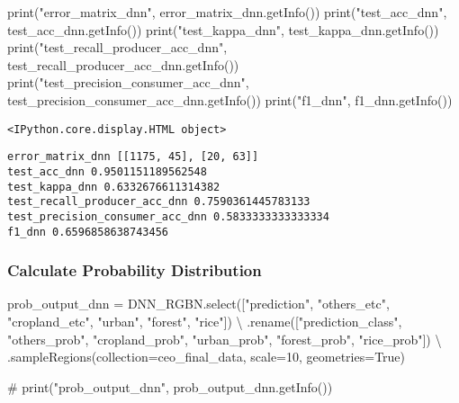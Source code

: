 \documentclass[
  letterpaper,
  DIV=11,
  numbers=noendperiod]{scrreprt}
\newenvironment{Shaded}{\begin{snugshade}}{\end{snugshade}}
\newcommand{\BuiltInTok}[1]{\textcolor[rgb]{0.00,0.23,0.31}{#1}}
\newcommand{\CommentTok}[1]{\textcolor[rgb]{0.37,0.37,0.37}{#1}}
\newcommand{\DecValTok}[1]{\textcolor[rgb]{0.68,0.00,0.00}{#1}}
\newcommand{\NormalTok}[1]{\textcolor[rgb]{0.00,0.23,0.31}{#1}}
\newcommand{\OperatorTok}[1]{\textcolor[rgb]{0.37,0.37,0.37}{#1}}
\newcommand{\StringTok}[1]{\textcolor[rgb]{0.13,0.47,0.30}{#1}}
\newcommand{\VariableTok}[1]{\textcolor[rgb]{0.07,0.07,0.07}{#1}}
\begin{document}
\begin{Shaded}
\begin{Highlighting}[]
\BuiltInTok{print}\NormalTok{(}\StringTok{"error\_matrix\_dnn"}\NormalTok{, error\_matrix\_dnn.getInfo())}
\BuiltInTok{print}\NormalTok{(}\StringTok{"test\_acc\_dnn"}\NormalTok{, test\_acc\_dnn.getInfo())}
\BuiltInTok{print}\NormalTok{(}\StringTok{"test\_kappa\_dnn"}\NormalTok{, test\_kappa\_dnn.getInfo())}
\BuiltInTok{print}\NormalTok{(}\StringTok{"test\_recall\_producer\_acc\_dnn"}\NormalTok{, test\_recall\_producer\_acc\_dnn.getInfo())}
\BuiltInTok{print}\NormalTok{(}\StringTok{"test\_precision\_consumer\_acc\_dnn"}\NormalTok{, test\_precision\_consumer\_acc\_dnn.getInfo())}
\BuiltInTok{print}\NormalTok{(}\StringTok{"f1\_dnn"}\NormalTok{, f1\_dnn.getInfo())}
\end{Highlighting}
\end{Shaded}

\begin{verbatim}
<IPython.core.display.HTML object>
\end{verbatim}

\begin{verbatim}
error_matrix_dnn [[1175, 45], [20, 63]]
test_acc_dnn 0.9501151189562548
test_kappa_dnn 0.6332676611314382
test_recall_producer_acc_dnn 0.7590361445783133
test_precision_consumer_acc_dnn 0.5833333333333334
f1_dnn 0.6596858638743456
\end{verbatim}

\subsubsection{Calculate Probability
Distribution}\label{calculate-probability-distribution-1}

\begin{Shaded}
\begin{Highlighting}[]
\NormalTok{prob\_output\_dnn }\OperatorTok{=}\NormalTok{ DNN\_RGBN.select([}\StringTok{"prediction"}\NormalTok{, }\StringTok{"others\_etc"}\NormalTok{, }\StringTok{"cropland\_etc"}\NormalTok{, }\StringTok{"urban"}\NormalTok{, }\StringTok{"forest"}\NormalTok{, }\StringTok{"rice"}\NormalTok{]) }\OperatorTok{\textbackslash{}}
\NormalTok{                            .rename([}\StringTok{"prediction\_class"}\NormalTok{, }\StringTok{"others\_prob"}\NormalTok{, }\StringTok{"cropland\_prob"}\NormalTok{, }\StringTok{"urban\_prob"}\NormalTok{, }\StringTok{"forest\_prob"}\NormalTok{, }\StringTok{"rice\_prob"}\NormalTok{]) }\OperatorTok{\textbackslash{}}
\NormalTok{                            .sampleRegions(collection}\OperatorTok{=}\NormalTok{ceo\_final\_data, scale}\OperatorTok{=}\DecValTok{10}\NormalTok{, geometries}\OperatorTok{=}\VariableTok{True}\NormalTok{)}

\CommentTok{\# print("prob\_output\_dnn", prob\_output\_dnn.getInfo())}
\end{Highlighting}
\end{Shaded}
\end{document}
